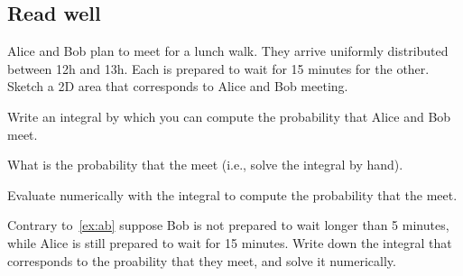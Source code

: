 \documentclass[../../assignments/assignments]{subfiles}
\begin{document}
\subsection{Read well}


\begin{exercise}\label{ex:ab}
Alice and  Bob plan to meet for a lunch walk. They arrive uniformly distributed between 12h and 13h. Each is prepared to wait for 15 minutes for the other.  Sketch a 2D area that corresponds to Alice and Bob meeting.
\begin{hint}
\end{hint}
\begin{solution}
\end{solution}
\end{exercise}

\begin{exercise}
Write an integral by which you can compute the probability that Alice and Bob meet.
\begin{hint}
\end{hint}
\begin{solution}
\end{solution}
\end{exercise}

\begin{exercise}
What is the probability that the meet (i.e., solve the integral by hand).
\begin{hint}
\end{hint}
\begin{solution}
\end{solution}
\end{exercise}

\begin{exercise}
Evaluate numerically with  the integral to compute the probability that the meet.

\begin{hint}
\end{hint}
\begin{solution}
\end{solution}
\end{exercise}


\begin{exercise}
Contrary to~\cref{ex:ab} suppose Bob is not prepared to wait longer than 5 minutes, while Alice is still prepared to wait for 15 minutes. Write down the integral that corresponds to the proability that they meet, and solve it numerically.
\begin{hint}
\end{hint}
\begin{solution}
\end{solution}
\end{exercise}
\end{document}
